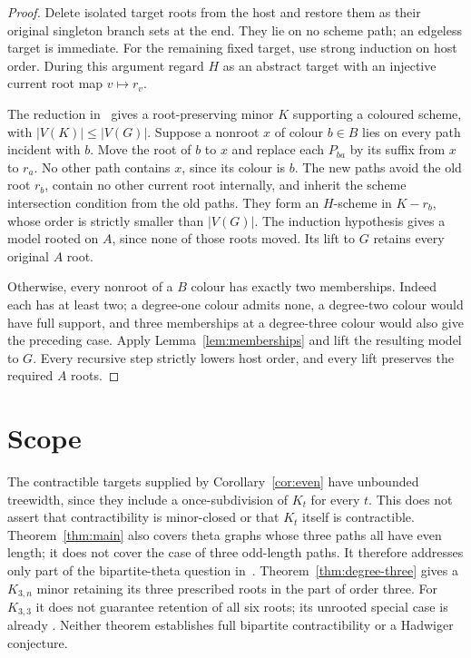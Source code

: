 \documentclass[11pt]{amsart}
\begin{document}
\begin{proof}
Delete isolated target roots from the host and restore them as their
original singleton branch sets at the end. They lie on no scheme path;
an edgeless target is immediate. For the remaining fixed target, use
strong induction on host order. During this argument regard $H$ as an
abstract target with an injective current root map $v\mapsto r_v$.

The reduction in~\cite[Lemma 3.3]{KPR} gives a root-preserving minor $K$
supporting a coloured scheme, with $|V(K)|\leq|V(G)|$. Suppose a nonroot
$x$ of colour $b\in B$ lies on every path incident with $b$. Move the
root of $b$ to $x$ and replace each $P_{ba}$ by its suffix from $x$ to
$r_a$. No other path contains $x$, since its colour is $b$. The new paths
avoid the old root $r_b$, contain no other current root internally, and
inherit the scheme intersection condition from the old paths. They form
an $H$-scheme in $K-r_b$, whose order is strictly smaller than $|V(G)|$.
The induction hypothesis gives a model rooted on $A$, since none of those
roots moved. Its lift to $G$ retains every original $A$ root.

Otherwise, every nonroot of a $B$ colour has exactly two memberships.
Indeed each has at least two; a degree-one colour admits none, a
degree-two colour would have full support, and three memberships at a
degree-three colour would also give the preceding case. Apply
Lemma~\ref{lem:memberships} and lift the resulting model to $G$.
Every recursive step strictly lowers host order, and every lift preserves
the required $A$ roots.
\end{proof}

\section{Scope}

The contractible targets supplied by Corollary~\ref{cor:even} have
unbounded treewidth, since they include a once-subdivision of $K_t$ for
every $t$. This does not assert that contractibility is minor-closed or
that $K_t$ itself is contractible. Theorem~\ref{thm:main} also covers
theta graphs whose three paths all have even length; it does not cover
the case of three odd-length paths. It therefore addresses only part of
the bipartite-theta question in~\cite[Section 8, Question 3]{KPR}.
Theorem~\ref{thm:degree-three} gives a $K_{3,n}$ minor retaining its three
prescribed roots in the part of order three. For $K_{3,3}$ it does not
guarantee retention of all six roots; its unrooted special case is already
\cite[Theorem 5.3]{KPR}. Neither theorem establishes full bipartite
contractibility or a Hadwiger conjecture.
\end{document}
